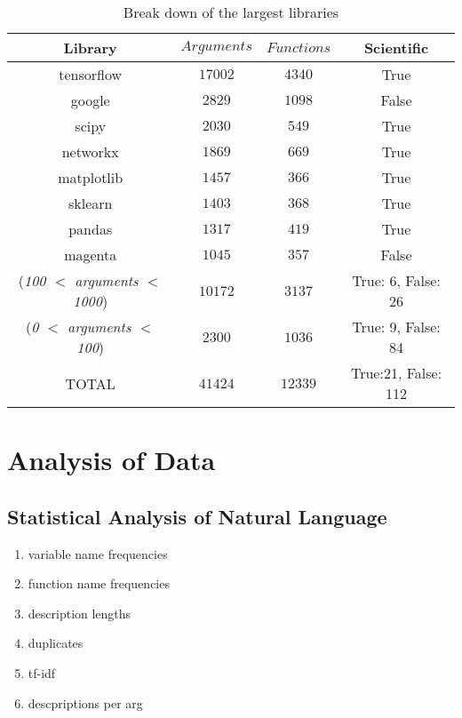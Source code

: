 \begin{table}[h!]
    \begin{center}
    \begin{tabular}{c | c | c | c}
        Library      & $ Arguments $     & $ Functions $ & Scientific \\
    \hline
        tensorflow   & $ 17002 $     & $ 4340 $ & True \\
        google   & $ 2829 $      & $ 1098 $ & False \\
        scipy    & $ 2030 $      & $ 549 $ & True \\
        networkx     & $ 1869 $      & $ 669 $ & True \\
        matplotlib   & $ 1457 $      & $ 366 $ & True \\
        sklearn      & $ 1403 $      & $ 368 $ & True \\
        pandas   & $ 1317 $      & $ 419 $ & True \\
        magenta      & $ 1045 $      & $ 357 $ & False \\
        (\textit{100 $<$ arguments $<$ 1000})   & $ 10172 $     & $ 3137 $ & True: 6, False: 26 \\
        (\textit{0 $<$ arguments $<$ 100})      & $ 2300 $      & $ 1036 $ & True: 9, False: 84 \\
    \hline
    \hline
        TOTAL    & $ 41424 $     & $ 12339 $ & True:21, False: 112 \\
    \end{tabular}
    \caption {Break down of the largest libraries}
    \label{table:breakdown_by_library}
    \end{center}
\end{table}
\section{Analysis of Data} %
\label{sec:analysis_of_data}


\subsection{Statistical Analysis of Natural Language} %
\label{sub:statistical_analysis_of_natural_language}

\begin{enumerate}
    \item variable name frequencies
    \item function name frequencies
    \item description lengths
    \item duplicates 
    \item tf-idf
    \item descpriptions per arg
\end{enumerate}

